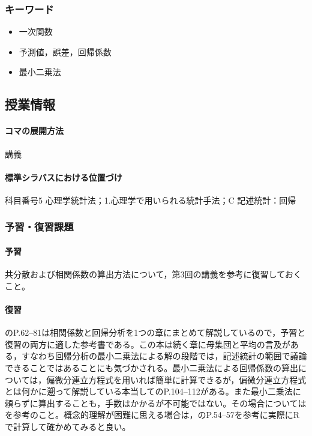 \subsubsection{キーワード}
\begin{itemize}
	\item 一次関数
	\item 予測値，誤差，回帰係数
	\item 最小二乗法
\end{itemize}
\subsection{授業情報}
\paragraph{コマの展開方法}
講義
\paragraph{標準シラバスにおける位置づけ}
科目番号5 心理学統計法；1.心理学で用いられる統計手法；C 記述統計：回帰
\subsubsection{予習・復習課題}
\paragraph{予習}
共分散および相関係数の算出方法について，第3回の講義を参考に復習しておくこと。
\paragraph{復習}
\textcite{Yamauchi201001}のP.62--81は相関係数と回帰分析を1つの章にまとめて解説しているので，予習と復習の両方に適した参考書である。この本は続く章に母集団と平均の言及がある，すなわち回帰分析の最小二乗法による解の段階では，記述統計の範囲で議論できることではあることにも気づかされる。最小二乗法による回帰係数の算出については，偏微分連立方程式を用いれば簡単に計算できるが，偏微分連立方程式とは何かに遡って解説している本当して\textcite{kosugi2018}のP.104--112がある。また最小二乗法に頼らずに算出することも，手数はかかるが不可能ではない。その場合については\textcite{Nishiuchi201712}を参考のこと。概念的理解が困難に思える場合は，\textcite{kosugi2018}のP.54--57を参考に実際にRで計算して確かめてみると良い。
